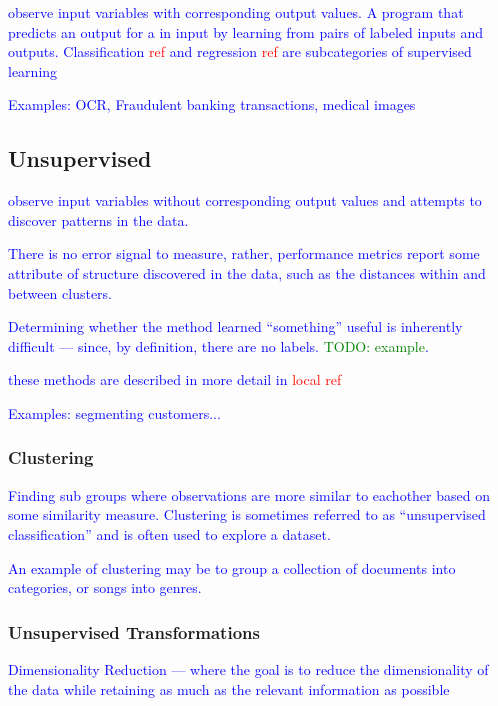 \textcolor{blue}{observe input variables with corresponding output values. A program that predicts an output for a in input by learning from pairs of labeled inputs and outputs. Classification \textcolor{red}{ref} and regression \textcolor{red}{ref} are subcategories of supervised learning}

\textcolor{blue}{Examples: OCR, Fraudulent banking transactions, medical images}

\subsection{Unsupervised}

\textcolor{blue}{observe input variables without corresponding output values and attempts to discover patterns in the data.}

\textcolor{blue}{There is no error signal to measure, rather, performance metrics report some attribute of structure discovered in the data, such as the distances within and between clusters.}

\textcolor{blue}{Determining whether the method learned ``something'' useful is inherently difficult --- since, by definition, there are no labels. \textcolor{green}{TODO: example}.}


\textcolor{blue}{these methods are described in more detail in \textcolor{red}{local ref}}

\textcolor{blue}{Examples: segmenting customers...}
 
\subsubsection{Clustering}

\textcolor{blue}{Finding sub groups where observations are more similar to eachother based on some similarity measure. Clustering is sometimes referred to as ``unsupervised classification'' and is often used to explore a dataset.}

\textcolor{blue}{An example of clustering may be to group a collection of documents into categories, or songs into genres.}

\subsubsection{Unsupervised Transformations}

\textcolor{blue}{Dimensionality Reduction --- where the goal is to reduce the dimensionality of the data while retaining as much as the relevant information as possible}

